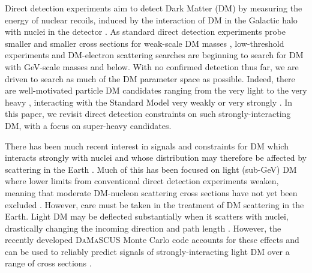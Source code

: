 \documentclass[prd,twocolumn,showpacs,nofootinbib,aps]{revtex4-1}
\begin{document}
Direct detection experiments aim to detect Dark Matter (DM) by measuring the energy of nuclear recoils, induced by the interaction of DM in the Galactic halo with nuclei in the detector \cite{Goodman:1984dc, Drukier:1986tm}. As standard direct detection experiments probe smaller and smaller cross sections for weak-scale DM masses  \cite{Aprile:2017iyp,Cui:2017nnn}, low-threshold experiments \cite{Petricca:2017zdp,Angloher:2017sxg} and DM-electron scattering searches \cite{Essig:2017kqs} are beginning to search for DM with GeV-scale masses and below. With no confirmed detection thus far, we are driven to search as much of the DM parameter space as possible. Indeed, there are well-motivated particle DM candidates ranging from the very light \cite{Knapen:2017xzo,An:2014twa} to the very heavy \cite{Kusenko:1997si,Chung:1998ua,Kolb:2007vd,Kolb:2017jvz}, interacting with the Standard Model very weakly \cite{Feng:2003xh,Steffen:2006hw,Benakli:2017whb} or very strongly \cite{Schissel:2006kx,Hochberg:2014dra,Bruggisser:2016ixa}. In this paper, we revisit direct detection constraints on such strongly-interacting DM, with a focus on super-heavy candidates.


There has been much recent interest in signals and constraints for DM which interacts strongly with nuclei and whose distribution may therefore be affected by scattering in the Earth \cite{Collar:1992qc,Collar:1993ss,Hasenbalg:1997hs}. Much of this has been focused on light (sub-GeV) DM where lower limits from conventional direct detection experiments weaken, meaning that moderate DM-nucleon scattering cross sections have not yet been excluded \cite{Foot:2011fh,Kouvaris:2014lpa,Kouvaris:2015laa,Foot:2014osa,Clarke:2015gqw,Bernabei:2015nia,Emken:2017erx,Davis:2017noy}. However, care must be taken in the treatment of DM scattering in the Earth. Light DM may be deflected substantially when it scatters with nuclei, drastically changing the incoming direction and path length \cite{Kavanagh:2016pyr,Mahdawi:2017cxz,Mahdawi:2017utm}. However, the recently developed \textsc{DaMaSCUS} Monte Carlo code \cite{Emken2017a} accounts for these effects and can be used to reliably predict signals of strongly-interacting light DM over a range of cross sections \cite{Emken:2017qmp}.
\end{document}
